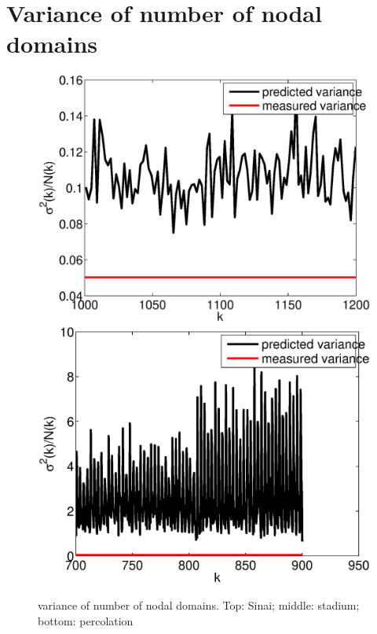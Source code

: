\documentclass{report}
\begin{document}
\section{Variance of number of nodal domains}
\begin{figure}
  \begin{center}
    \includegraphics[width=\textwidth]{figs/results/qugrs_1000_to_1200_variance.eps}
    \includegraphics[width=\textwidth]{figs/results/qust_700_to_900_variance.eps}

    \caption{variance of number of nodal domains. Top: Sinai; middle: stadium; bottom: percolation}
    \label{fig:variance}
  \end{center}
\end{figure}
\end{document}
